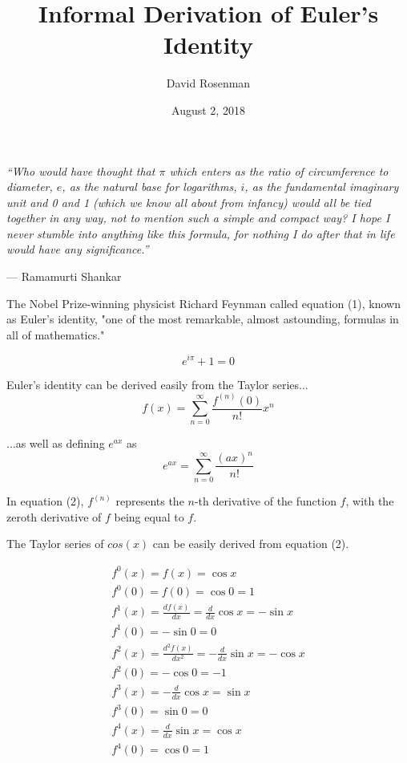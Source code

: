 \documentclass[11pt]{article}
\title{Informal Derivation of Euler's Identity}
\author{David Rosenman}
\date{August 2, 2018}
\begin{document}
\maketitle

\begin{mdframed}
\emph{%
“Who would have thought that $\pi$ which enters as the ratio of
circumference to diameter, $e$, as the natural base for logarithms,
$i$, as the fundamental imaginary unit and 0 and 1 (which we know
all about from infancy) would all be tied together in any way,
not to mention such a simple and compact way? I hope I never
stumble into anything like this formula, for nothing I do after
that in life would have any significance.”
}

\hfill — Ramamurti Shankar
\end{mdframed}

The Nobel Prize-winning physicist Richard Feynman called equation (1), known as Euler's identity, "one of the most remarkable, almost astounding, formulas in all of mathematics."

\begin{equation}
    {e^{i\pi }} + 1 = 0
\end{equation}

Euler's identity can be derived easily from the Taylor series...
\begin{equation}
f\left( x \right) = \sum\limits_{n = 0}^\infty  {\frac{{{f^{\left( n \right)}}\left( 0 \right)}}{{n!}}{x^n}} 
\end{equation}

...as well as defining $e^{ax}$ as
\begin{equation}
    {e^{ax}} = \sum\limits_{n = 0}^\infty  {\frac{{{{\left( {ax} \right)}^n}}}{{n!}}} 
\end{equation}

In equation (2), $f^(n)$ represents the $n$-th derivative of the function $f$, with the zeroth derivative of $f$ being equal to $f$.

The Taylor series of $cos(x)$ can be easily derived from equation (2).

\[
\renewcommand{\arraystretch}{1.25} %
\begin{array}{l}
{f^0}\left( x \right) = f\left( x \right) = \cos x\\
{f^0}\left( 0 \right) = f\left( 0 \right) = \cos 0 = 1\\
{f^1}\left( x \right) = \frac{{df\left( x \right)}}{{dx}} = \frac{d}{{dx}}\cos x =  - \sin x\\
{f^1}\left( 0 \right) =  - \sin 0 = 0\\
{f^2}\left( x \right) = \frac{{{d^2}f\left( x \right)}}{{dx^2}} =  - \frac{d}{{dx}}\sin x =  - \cos x\\
{f^2}\left( 0 \right) =  - \cos 0 =  - 1\\
{f^3}\left( x \right) =  - \frac{d}{{dx}}\cos x = \sin x\\
{f^3}\left( 0 \right) = \sin 0 = 0\\
{f^4}\left( x \right) = \frac{d}{{dx}}\sin x = \cos x\\
{f^4}\left( 0 \right) = \cos 0 = 1\\
\end{array}
\]
\end{document}
